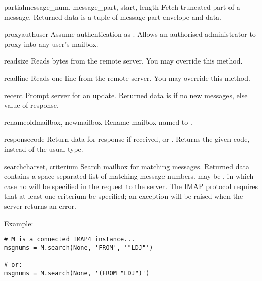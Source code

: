 \begin{methoddesc}{partial}{message_num, message_part, start, length}
  Fetch truncated part of a message.
  Returned data is a tuple of message part envelope and data.
\end{methoddesc}

\begin{methoddesc}{proxyauth}{user}
  Assume authentication as .
  Allows an authorised administrator to proxy into any user's mailbox.
\end{methoddesc}

\begin{methoddesc}{read}{size}
  Reads  bytes from the remote server.
  You may override this method.
\end{methoddesc}

\begin{methoddesc}{readline}{}
  Reads one line from the remote server.
  You may override this method.
\end{methoddesc}

\begin{methoddesc}{recent}{}
  Prompt server for an update. Returned data is  if no new
  messages, else value of  response.
\end{methoddesc}

\begin{methoddesc}{rename}{oldmailbox, newmailbox}
  Rename mailbox named  to .
\end{methoddesc}

\begin{methoddesc}{response}{code}
  Return data for response  if received, or
  . Returns the given code, instead of the usual type.
\end{methoddesc}

\begin{methoddesc}{search}{charset, criterium}
  Search mailbox for matching messages.  Returned data contains a space
  separated list of matching message numbers.   may be
  , in which case no  will be specified in the
  request to the server.  The IMAP protocol requires that at least one
  criterium be specified; an exception will be raised when the server
  returns an error.

  Example:

\begin{verbatim}
# M is a connected IMAP4 instance...
msgnums = M.search(None, 'FROM', '"LDJ"')

# or:
msgnums = M.search(None, '(FROM "LDJ")')
\end{verbatim}
\end{methoddesc}

